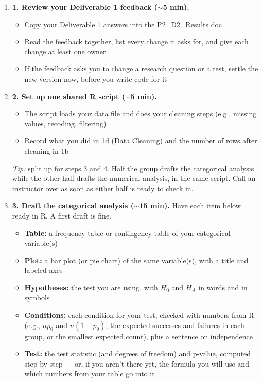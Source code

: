 \documentclass[12pt]{article}
\begin{document}
\begin{enumerate}
    \item[$\square$] \textbf{1. Review your Deliverable 1 feedback ($\sim$5 min).}
    \begin{itemize}[nosep]
        \item[$\square$] Copy your Deliverable 1 answers into the P2\_D2\_Results doc
        \item[$\square$] Read the feedback together, list every change it asks for, and give each change at least one owner
        \item[$\square$] If the feedback asks you to change a research question or a test, settle the new version now, before you write code for it
    \end{itemize}

    \item[$\square$] \textbf{2. Set up one shared R script ($\sim$5 min).}
    \begin{itemize}[nosep]
        \item[$\square$] The script loads your data file and does your cleaning steps (e.g., missing values, recoding, filtering)
        \item[$\square$] Record what you did in 1d (Data Cleaning) and the number of rows after cleaning in 1b
    \end{itemize}
    \emph{Tip:} split up for steps 3 and 4. Half the group drafts the categorical analysis while the other half drafts the numerical analysis, in the same script. Call an instructor over as soon as either half is ready to check in.

    \item[$\square$] \textbf{3. Draft the categorical analysis ($\sim$15 min).} Have each item below ready in R. A first draft is fine.
    \begin{itemize}[nosep]
        \item[$\square$] \textbf{Table:} a frequency table or contingency table of your categorical variable(s)
        \item[$\square$] \textbf{Plot:} a bar plot (or pie chart) of the same variable(s), with a title and labeled axes
        \item[$\square$] \textbf{Hypotheses:} the test you are using, with $H_0$ and $H_A$ in words and in symbols
        \item[$\square$] \textbf{Conditions:} each condition for your test, checked with numbers from R (e.g., $np_0$ and $n(1-p_0)$, the expected successes and failures in each group, or the smallest expected count), plus a sentence on independence
        \item[$\square$] \textbf{Test:} the test statistic (and degrees of freedom) and p-value, computed step by step --- or, if you aren't there yet, the formula you will use and which numbers from your table go into it
    \end{itemize}


\end{enumerate}
\end{document}
